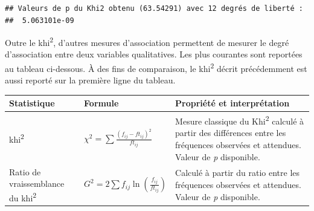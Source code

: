 \documentclass[
  11pt,
  french,
]{book}
\makeatletter
\newenvironment{kframev}{%
\medskip{}
\setlength{\fboxsep}{.8em}
 \def\at@end@of@kframev{}%
 \ifinner\ifhmode%
  \def\at@end@of@kframev{\end{minipage}}%
  \begin{minipage}{\columnwidth}%
 \fi\fi%
 \def\FrameCommand##1{\hskip\@totalleftmargin \hskip-\fboxsep
 \colorbox{shadebluecolor}{##1}\hskip-\fboxsep
     \hskip-\linewidth \hskip-\@totalleftmargin \hskip\columnwidth}%
 \MakeFramed {\advance\hsize-\width
   \@totalleftmargin\z@ \linewidth\hsize
   \@setminipage}}%
 {\par\unskip\endMakeFramed%
 \at@end@of@kframev}
\newenvironment{rmdblock}[1]
  {
  \begin{itemize}
  \renewcommand{\labelitemi}{
    \raisebox{-.7\height}[0pt][0pt]{
      {\setkeys{Gin}{width=3em,keepaspectratio}\texttt{[image: images/\#1]}}
    }
  }
  \setlength{\fboxsep}{1em}
  \begin{kframev}
  \small
  \item
  }
  {
  \end{kframev}
  \end{itemize}
  }
\newenvironment{bloc_aller_loin}
  {\begin{rmdblock}{aller_loin}}
  {\end{rmdblock}}
\makeatother
\begin{document}
\begin{verbatim}
## Valeurs de p du Khi2 obtenu (63.54291) avec 12 degrés de liberté : 
##  5.063101e-09
\end{verbatim}

\begin{bloc_aller_loin}

Outre le khi\textsuperscript{2}, d'autres mesures d'association permettent de mesurer le degré d'association entre deux variables qualitatives. Les plus courantes sont reportées au tableau ci-dessous. À des fins de comparaison, le khi\textsuperscript{2} décrit précédemment est aussi reporté sur la première ligne du tableau.

\begin{longtable}[]{@{}lll@{}}
\toprule
\begin{minipage}[b]{0.17\columnwidth}\raggedright
Statistique\strut
\end{minipage} & \begin{minipage}[b]{0.15\columnwidth}\raggedright
Formule\strut
\end{minipage} & \begin{minipage}[b]{0.60\columnwidth}\raggedright
Propriété et interprétation\strut
\end{minipage}\tabularnewline
\midrule
\endhead
\begin{minipage}[t]{0.17\columnwidth}\raggedright
khi\textsuperscript{2}\strut
\end{minipage} & \begin{minipage}[t]{0.15\columnwidth}\raggedright
\(\chi^2 = \sum \frac{(f_{ij}-ft_{ij})^2}{ft_{ij}}\)\strut
\end{minipage} & \begin{minipage}[t]{0.60\columnwidth}\raggedright
Mesure classique du Khi\textsuperscript{2} calculé à partir des différences entre les fréquences observées et attendues. Valeur de \emph{p} disponible.\strut
\end{minipage}\tabularnewline
\begin{minipage}[t]{0.17\columnwidth}\raggedright
Ratio de vraissemblance du khi\textsuperscript{2}\strut
\end{minipage} & \begin{minipage}[t]{0.15\columnwidth}\raggedright
\(G^2 = 2 \sum f_{ij} \ln{(\frac{f_{ij}}{ft_{ij}})}\)\strut
\end{minipage} & \begin{minipage}[t]{0.60\columnwidth}\raggedright
Calculé à partir du ratio entre les fréquences observées et attendues. Valeur de \emph{p} disponible.\strut

\end{minipage}
\end{longtable}
\end{bloc_aller_loin}
\end{document}
